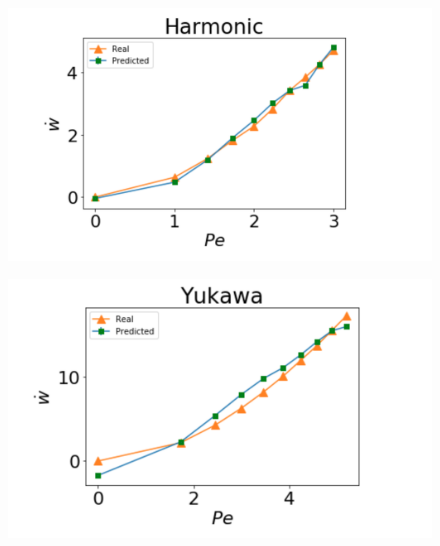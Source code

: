 \documentclass[amsmath,preprintnumbers,10pt,nofootinbib,prl,twocolumn]{revtex4-1}
\begin{document}
\begin{figure}
    \centering
    \includegraphics[scale=0.5, clip=True]{harmonic.png}
    \caption{}
    \label{Fig:n}
\end{figure}

\begin{figure}
    \centering
    \includegraphics[scale=0.5, clip=True]{yukawa.png}
    \caption{}
    \label{Fig:n}
\end{figure}
\end{document}
